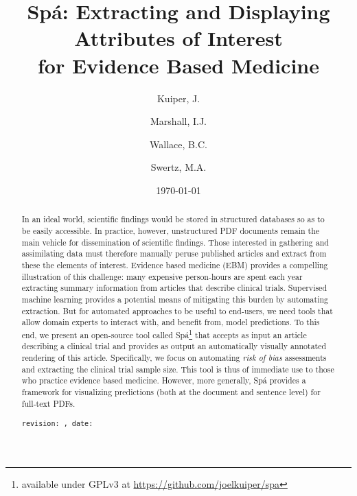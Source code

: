 \documentclass[runningheads,a4paper]{llncs}
\institute{University of Groningen \and Kings College London \and Brown University}
\author{Kuiper, J\inst{1}. \and Marshall, I.J.\inst{2} \and Wallace, B.C.\inst{3} \and Swertz, M.A.\inst{1}}
\date{\today}
\title{Sp{\' a}: Extracting and Displaying Attributes of Interest \\ for Evidence Based Medicine}
\begin{document}
\maketitle
\begin{abstract}
	
In an ideal world, scientific findings would be stored in structured databases so as to be easily accessible. In practice, however, unstructured PDF documents remain the main vehicle for dissemination of scientific findings. Those interested in gathering and assimilating data must therefore manually peruse published articles and extract from these the elements of interest. Evidence based medicine (EBM) provides a compelling illustration of this challenge: many expensive person-hours are spent each year extracting summary information from articles that describe clinical trials. Supervised machine learning provides a potential means of mitigating this burden by automating extraction. But for automated approaches to be useful to end-users, we need tools that allow domain experts to interact with, and benefit from, model predictions. To this end, we present an open-source tool called {Sp\'a}\footnote{available under GPLv3 at \url{https://github.com/joelkuiper/spa}} that accepts as input an article describing a clinical trial and provides as output an automatically visually annotated rendering of this article. Specifically, we focus on automating \emph{risk of bias} assessments and extracting the clinical trial sample size. This tool is thus of immediate use to those who practice evidence based medicine. However, more generally, {Sp\'a} provides a framework for visualizing predictions (both at the document and sentence level) for full-text PDFs. 




\texttt{revision: \revision, date: \revisiondate}
\end{abstract}
\end{document}
